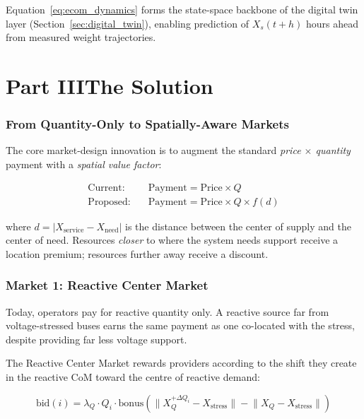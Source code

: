 \documentclass[12pt, a4paper]{article}
\begin{document}
Equation~\eqref{eq:ecom_dynamics} forms the state-space backbone of the
digital twin layer (Section~\ref{sec:digital_twin}), enabling prediction of
$X_s(t+h)$ hours ahead from measured weight trajectories.

\part*{Part III\quad The Solution}

\section{From Quantity-Only to Spatially-Aware Markets}
\label{sec:market_principle}

The core market-design innovation is to augment the standard
\emph{price $\times$ quantity} payment with a \emph{spatial value factor}:

\begin{align}
  \text{Current:}\quad   & \text{Payment} = \text{Price} \times Q \\[4pt]
  \text{Proposed:}\quad  & \text{Payment} = \text{Price} \times Q
                            \times f\!\left(d\right)
  \label{eq:spatial_payment}
\end{align}

where $d = \lvert X_{\text{service}} - X_{\text{need}} \rvert$ is the
distance between the center of supply and the center of need.
Resources \emph{closer} to where the system needs support receive a
location premium; resources further away receive a discount.

\section{Market 1: Reactive Center Market}
\label{sec:reactive_market}

Today, operators pay for reactive quantity only.
A reactive source far from voltage-stressed buses earns the same payment as one
co-located with the stress, despite providing far less voltage support.

The Reactive Center Market rewards providers according to the shift they create
in the reactive CoM toward the centre of reactive demand:

\begin{equation}
  \text{bid}(i) = \lambda_Q \cdot Q_i \cdot \text{bonus}\!\left(
    \lVert X_Q^{+\Delta Q_i} - X_{\text{stress}} \rVert
    - \lVert X_Q - X_{\text{stress}} \rVert
  \right)
\end{equation}
\end{document}
